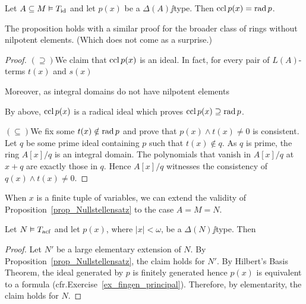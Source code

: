 \documentclass[creche.tex]{subfiles}
\begin{document}
\begin{proposition}\label{prop_chiusura-radicale}
Let $A\subseteq M\models T_{\rm id}$ and let $p(x)$ be a $\Delta(A)\jj$type. Then $\ccl\,p(x)=\rad p$.
\end{proposition}
The proposition holds with a similar proof for the broader class of rings without nilpotent elements. (Which does not come as a surprise.)
\begin{proof}
$(\supseteq)$\quad We claim that $\ccl\,p(x)$ is an ideal. In fact, for every pair of $L(A)$-terms $t(x)$ and $s(x)$



Moreover, as integral domains do not have nilpotent elements


By \ssf{\#} above, $\ccl\,p(x)$ is a radical ideal which proves $\ccl\,p(x)\supseteq \rad p$.

$(\subseteq)$\quad We fix some $t(x)\notin\rad p$ and prove that $p(x)\wedge t(x)\neq0$ is consistent. Let $q$ be some prime ideal containing $p$ such that $t(x)\notin q$.  As $q$ is prime, the ring $A[x]/q$ is an integral domain. The polynomials that vanish in  $A[x]/q$ at $x+q$ are exactly those in $q$. Hence $A[x]/q$ witnesses the consistency of $q(x)\wedge t(x)\neq0$.
\end{proof}

When $x$ is a finite tuple of variables, we can extend the validity of Proposition~\ref{prop_Nullstellensatz} to the case $A=M=N$.

\begin{corollary}\label{coroll_Nullstellensatz}
Let $N\models T_{\rm acf}$ and let $p(x)$, where $|x|<\omega$, be a $\Delta(N)\jj$type. Then


\end{corollary}



\begin{proof}
Let $N'$ be a large elementary extension of $N$. By Proposition~\ref{prop_Nullstellensatz}, the claim holds for $N'$. By Hilbert's Basis Theorem, the ideal generated by $p$ is finitely generated hence $p(x)$ is equivalent to a formula (cfr.\@ Exercise~\ref{ex_fingen_principal}). Therefore, by elementarity, the claim holds for $N$.
\end{proof}
\end{document}
